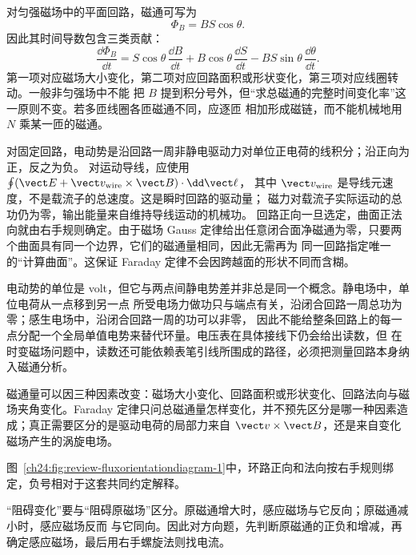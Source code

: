 \movingMagnetExperimentFigure

对匀强磁场中的平面回路，磁通可写为
\begin{equation}
  \Phi_B=BS\cos\theta.
\end{equation}
因此其时间导数包含三类贡献：
\begin{equation}
 \frac{\dd\Phi_B}{\dd t}
 =S\cos\theta\,\frac{\dd B}{\dd t}
 +B\cos\theta\,\frac{\dd S}{\dd t}
 -BS\sin\theta\,\frac{\dd\theta}{\dd t}.
\end{equation}
第一项对应磁场大小变化，第二项对应回路面积或形状变化，第三项对应线圈转动。一般非匀强场中不能
把 $B$ 提到积分号外，但“求总磁通的完整时间变化率”这一原则不变。若多匝线圈各匝磁通不同，应逐匝
相加形成磁链，而不能机械地用 $N$ 乘某一匝的磁通。

对固定回路，电动势是沿回路一周非静电驱动力对单位正电荷的线积分；沿正向为正，反之为负。
对运动导线，应使用 $\oint(\vect E+\vect v_{\rm wire}\times\vect B)\cdot\dd\vect\ell$，
其中 $\vect v_{\rm wire}$ 是导线元速度，不是载流子的总速度。这是瞬时回路的驱动量；
磁力对载流子实际运动的总功仍为零，输出能量来自维持导线运动的机械功。
回路正向一旦选定，曲面正法向就由右手规则确定。由于磁场
Gauss 定律给出任意闭合面净磁通为零，只要两个曲面具有同一个边界，它们的磁通量相同，因此无需再为
同一回路指定唯一的“计算曲面”。这保证 Faraday 定律不会因跨越面的形状不同而含糊。

电动势的单位是 volt，但它与两点间静电势差并非总是同一个概念。静电场中，单位电荷从一点移到另一点
所受电场力做功只与端点有关，沿闭合回路一周总功为零；感生电场中，沿闭合回路一周的功可以非零，
因此不能给整条回路上的每一点分配一个全局单值电势来替代环量。电压表在具体接线下仍会给出读数，但
在时变磁场问题中，读数还可能依赖表笔引线所围成的路径，必须把测量回路本身纳入磁通分析。

磁通量可以因三种因素改变：磁场大小变化、回路面积或形状变化、回路法向与磁场夹角变化。Faraday
定律只问总磁通量怎样变化，并不预先区分是哪一种因素造成；真正需要区分的是驱动电荷的局部力来自
$\vect v\times\vect B$，还是来自变化磁场产生的涡旋电场。

图~\ref{ch24:fig:review-fluxorientationdiagram-1}中，环路正向和法向按右手规则绑定，负号相对于这套共同约定解释。
\par\noindent\begin{minipage}{\linewidth}
\fluxOrientationDiagram
{}\label{ch24:fig:review-fluxorientationdiagram-1}
\end{minipage}\par\medskip

“阻碍变化”要与“阻碍原磁场”区分。原磁通增大时，感应磁场与它反向；原磁通减小时，感应磁场反而
与它同向。因此对方向题，先判断原磁通的正负和增减，再确定感应磁场，最后用右手螺旋法则找电流。

